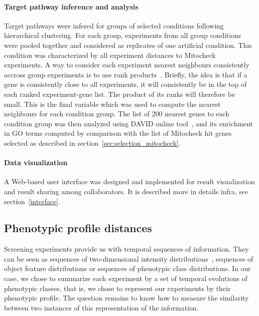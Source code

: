 \paragraph*{Target pathway inference and analysis\\}
Target pathways were infered for groups of selected conditions following hierarchical clustering. For each group, experiments from all group conditions were pooled together and considered as replicates of one artificial condition. This condition was characterized by all experiment distances to Mitocheck experiments. A way to consider each experiment nearest neighbours consistently accross group experiments is to use rank products~\cite{pmid15327980}. Briefly, the idea is that if a gene is consistently close to all experiments, it will consistently be in the top of each ranked experiment-gene list. The product of its ranks will therefore be small. This is the final variable which was used to compute the nearest neighbours for each condition group. The list of 200 nearest genes to each condition group was then analyzed using DAVID online tool~\cite{pmid22543366}, and its enrichment in GO terms computed by comparison with the list of Mitocheck hit genes selected as described in section~\ref{sec:selection_mitocheck}.

\paragraph*{Data visualization\\}
A Web-based user interface was designed and implemented for result visualization and result sharing among collaborators. It is described more in details infra, see section~\ref{interface}.

\subsection{Phenotypic profile distances}
\label{sec:distances}
Screening experiments provide us with temporal sequences of information. They can be seen as sequences of 
two-dimensional intensity distributions~\cite{pmid22743764}, sequences of object
feature distributions or sequences of phenotypic class
distributions. In our case, we chose to summarize each experiment by a
set of temporal evolutions of phenotypic classes, that is, we chose to
represent our experiments by their phenotypic profile. The question
remains to know how to measure the similarity between two instances of
this representation of the information. 

